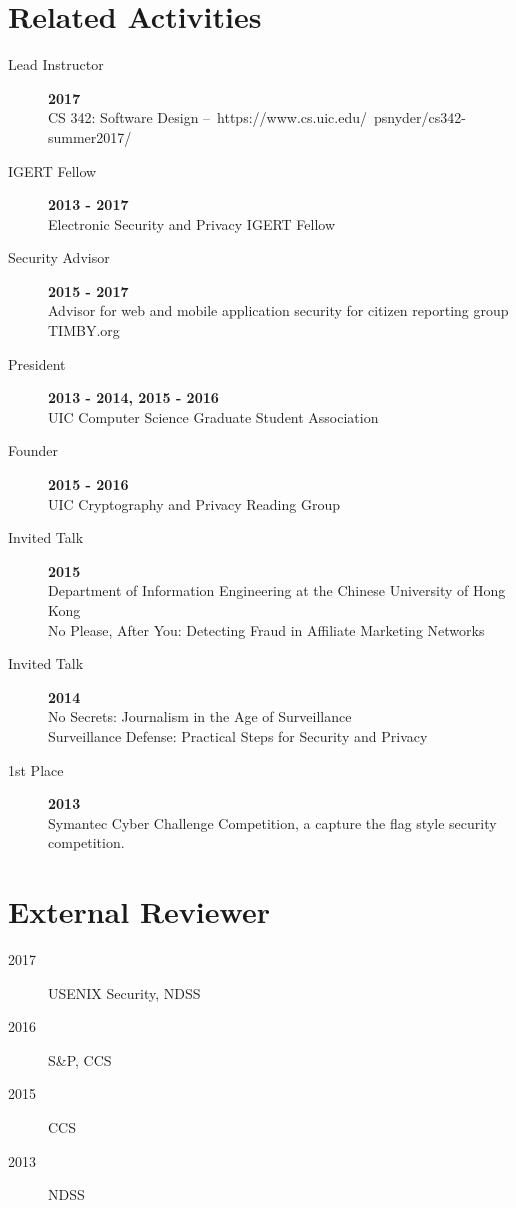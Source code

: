 \documentclass{vitae}
\begin{document}
  \section{Related Activities}
  \begin{description}

    \item[Lead Instructor] \hfill \textbf{2017}\\
    CS 342: Software Design – https://www.cs.uic.edu/~psnyder/cs342-summer2017/

    \item[IGERT Fellow] \hfill \textbf{2013 - 2017}\\
    Electronic Security and Privacy IGERT Fellow

    \item[Security Advisor] \hfill \textbf{2015 - 2017}\\
    Advisor for web and mobile application security for citizen reporting group TIMBY.org

    \item[President] \hfill \textbf{2013 - 2014, 2015 - 2016}\\
    UIC Computer Science Graduate Student Association

    \item[Founder] \hfill \textbf{2015 - 2016}\\
    UIC Cryptography and Privacy Reading Group

    \item[Invited Talk] \hfill \textbf{2015}\\
    Department of Information Engineering at the Chinese University of Hong Kong\\
    No Please, After You: Detecting Fraud in Affiliate Marketing Networks

    \item[Invited Talk] \hfill \textbf{2014}\\
    No Secrets: Journalism in the Age of Surveillance\\
    Surveillance Defense: Practical Steps for Security and Privacy

    \item[1st Place] \hfill \textbf{2013}\\
    Symantec Cyber Challenge Competition, a capture the flag style security competition.
  \end{description}

  \section{External Reviewer}
  \begin{description}
    \item [2017] USENIX Security, NDSS
    \item [2016] S\&P, CCS
    \item [2015] CCS
    \item [2013] NDSS
  \end{description}
\end{document}
